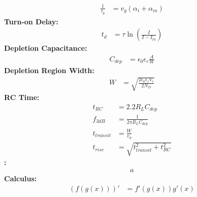 \documentclass[landscape,a4paper,8pt]{article}
\begin{document}
\begin{multicols}{4}
\begin{align}
		\frac{1}{\tau_p} &= v_g(\alpha_i + \alpha_m)
	\end{align}
	\hspace{3mm}\textbf{Turn-on Delay:}
	\begin{align}
		t_d &= \tau \ln \left( \frac{I}{I - I_{th}} \right)
	\end{align}
	\hspace{3mm}\textbf{Depletion Capacitance:}
	\begin{align}
		C_{dep} &= \epsilon_0 \epsilon_r \frac{A}{W}
	\end{align}
	\hspace{3mm}\textbf{Depletion Region Width:}
	\begin{align}
		W &= \sqrt{\frac{2\epsilon_0 \epsilon_r V_r}{2N_D}}
	\end{align}
	\hspace{3mm}\textbf{RC Time:}
	\begin{align}
		t_{RC} &= 2.2 R_L C_{dep}\\
		f_{3dB} &= \frac{1}{2\pi R_L C_{dep}}\\
		t_{transit} &= \frac{W}{v_d}\\
		t_{rise} &= \sqrt{t_{transit}^2 + t_{RC}^2}
	\end{align}
	\hspace{3mm}\textbf{:}
	\begin{align}
		a		
	\end{align}
	\textbf{Calculus:}
	\begin{align}
		(f(g(x)))' &= f'(g(x))g'(x)
	\end{align}
\end{multicols}
\end{document}
